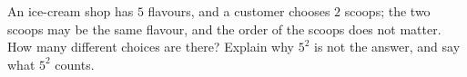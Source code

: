An ice-cream shop has $5$ flavours, and a customer chooses $2$ scoops; the two scoops may be the same flavour, and the order of the scoops does not matter. How many different choices are there? Explain why $5^2$ is not the answer, and say what $5^2$ counts.
